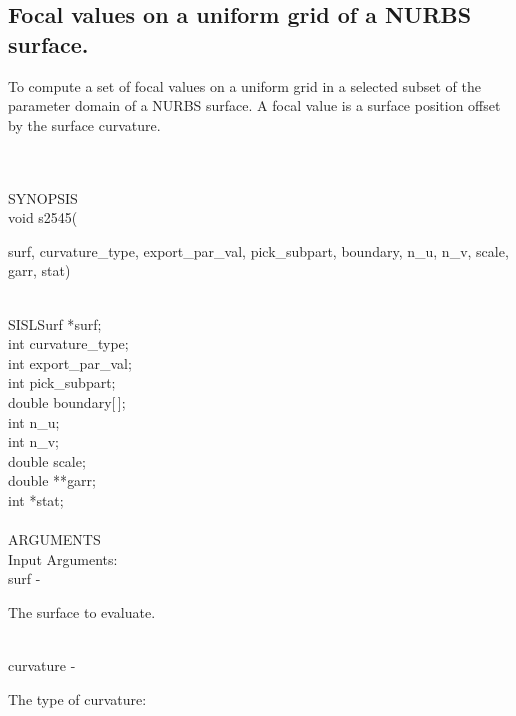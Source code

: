 \subsection{Focal values on a uniform grid of a NURBS surface.}
\begin{minipg1}
To compute a set of focal values on a uniform grid
            in a selected subset of the parameter domain of a
            NURBS surface. A focal value is a surface position offset
            by the surface curvature.
\end{minipg1} \\ \\
SYNOPSIS\\
        \> void s2545(\begin{minipg3}
            {\fov surf}, {\fov curvature\_type},  {\fov export\_par\_val},  {\fov pick\_subpart}, boundary,  {\fov n\_u},  {\fov n\_v}, 
       {\fov scale}, {\fov garr},  {\fov stat})
                \end{minipg3}\\
                \>\>    SISLSurf \> *{\fov surf};\\
                \>\>    int \> {\fov curvature\_type};\\
                \>\>    int \> {\fov export\_par\_val};\\
                \>\>    int \> {\fov pick\_subpart};\\
                \>\>    double \> {\fov boundary}[\,];\\
                \>\>    int \> {\fov n\_u};\\
                \>\>    int \> {\fov n\_v};\\
                \>\>    double \> {\fov scale};\\
                \>\>    double \> **{\fov garr};\\
                \>\>    int \> *{\fov stat};\\
\\
ARGUMENTS\\
	\>Input Arguments:\\
        \>\>    {\fov surf}\> - \>  \begin{minipg2}
                     The surface to evaluate.
                               \end{minipg2}\\[0.8ex]
        \>\>    {\fov curvature}\> - \>  \begin{minipg2}
                     The type of curvature:
                               \end{minipg2}\\[0.8ex]

